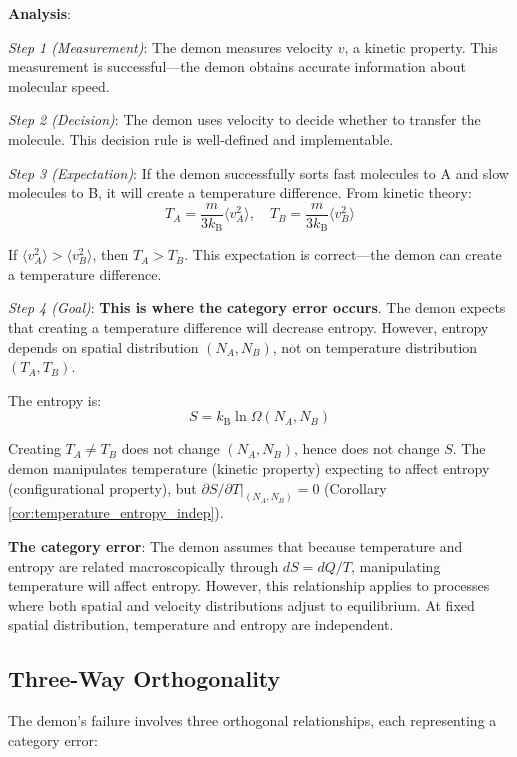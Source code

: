 \documentclass[10pt,twocolumn,letterpaper]{article}
\theoremstyle{definition}
\theoremstyle{remark}
\newcommand{\kb}{k_\text{B}}
\newcommand{\Om}{\Omega}
\begin{document}
\textbf{Analysis}:

\textit{Step 1 (Measurement)}: The demon measures velocity $v$, a kinetic property. This measurement is successful—the demon obtains accurate information about molecular speed.

\textit{Step 2 (Decision)}: The demon uses velocity to decide whether to transfer the molecule. This decision rule is well-defined and implementable.

\textit{Step 3 (Expectation)}: If the demon successfully sorts fast molecules to A and slow molecules to B, it will create a temperature difference. From kinetic theory:
\begin{equation}
T_A = \frac{m}{3\kb} \langle v_A^2 \rangle, \quad T_B = \frac{m}{3\kb} \langle v_B^2 \rangle
\end{equation}

If $\langle v_A^2 \rangle > \langle v_B^2 \rangle$, then $T_A > T_B$. This expectation is correct—the demon can create a temperature difference.

\textit{Step 4 (Goal)}: \textbf{This is where the category error occurs}. The demon expects that creating a temperature difference will decrease entropy. However, entropy depends on spatial distribution $(N_A, N_B)$, not on temperature distribution $(T_A, T_B)$.

The entropy is:
\begin{equation}
S = \kb \ln \Om(N_A, N_B)
\end{equation}

Creating $T_A \neq T_B$ does not change $(N_A, N_B)$, hence does not change $S$. The demon manipulates temperature (kinetic property) expecting to affect entropy (configurational property), but $\partial S/\partial T|_{(N_A, N_B)} = 0$ (Corollary \ref{cor:temperature_entropy_indep}).

\textbf{The category error}: The demon assumes that because temperature and entropy are related macroscopically through $dS = dQ/T$, manipulating temperature will affect entropy. However, this relationship applies to processes where both spatial and velocity distributions adjust to equilibrium. At fixed spatial distribution, temperature and entropy are independent.

\subsection{Three-Way Orthogonality}

The demon's failure involves three orthogonal relationships, each representing a category error:
\end{document}
